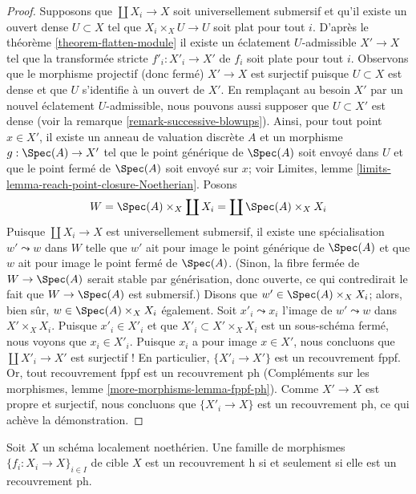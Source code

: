 \begin{proof}
\medskip\noindent
Supposons que $\coprod X_i \to X$ soit universellement submersif et
qu'il existe un ouvert dense $U \subset X$ tel que
$X_i \times_X U \to U$ soit plat pour tout $i$.
D'après le théorème \ref{theorem-flatten-module}
il existe un éclatement $U$-admissible $X' \to X$ tel que
la transformée stricte $f'_i : X'_i \to X'$ de $f_i$ soit plate pour tout $i$.
Observons que le morphisme projectif (donc fermé) $X' \to X$
est surjectif puisque $U \subset X$ est dense et que $U$ s'identifie
à un ouvert de $X'$. En remplaçant au besoin $X'$ par un nouvel
éclatement $U$-admissible, nous pouvons aussi supposer que $U \subset X'$ est dense
(voir la remarque \ref{remark-successive-blowups}).
Ainsi, pour tout point $x \in X'$, il existe un anneau de valuation discrète $A$
et un morphisme $g : \Spec(A) \to X'$ tel que le point
générique de $\Spec(A)$ soit envoyé dans $U$ et que le point fermé de
$\Spec(A)$ soit envoyé sur $x$; voir Limites, lemme
\ref{limits-lemma-reach-point-closure-Noetherian}.
Posons
$$
W = \Spec(A) \times_X \coprod X_i = \coprod \Spec(A) \times_X X_i
$$
Puisque $\coprod X_i \to X$ est universellement submersif,
il existe une spécialisation $w' \leadsto w$ dans $W$
telle que $w'$ ait pour image le point générique de $\Spec(A)$
et que $w$ ait pour image le point fermé de $\Spec(A)$.
(Sinon, la fibre fermée de $W \to \Spec(A)$
serait stable par générisation, donc ouverte, ce qui
contredirait le fait que $W \to \Spec(A)$ est submersif.)
Disons que $w' \in \Spec(A) \times_X X_i$; alors, bien sûr,
$w \in \Spec(A) \times_X X_i$ également. Soit
$x'_i \leadsto x_i$ l'image de $w' \leadsto w$ dans
$X' \times_X X_i$. Puisque $x'_i \in X'_i$ et que
$X'_i \subset X' \times_X X_i$ est un sous-schéma fermé,
nous voyons que $x_i \in X'_i$. Puisque $x_i$ a pour image $x \in X'$,
nous concluons que
$\coprod X'_i \to X'$ est surjectif ! En particulier,
$\{X'_i \to X'\}$ est un recouvrement fppf. Or, tout recouvrement fppf est un recouvrement ph
(Compléments sur les morphismes, lemme \ref{more-morphisms-lemma-fppf-ph}).
Comme $X' \to X$ est propre et surjectif, nous concluons
que $\{X'_i \to X\}$ est un recouvrement ph, ce qui achève la démonstration.
\end{proof}

\begin{lemma}
\label{lemma-Noetherian-h-ph}
Soit $X$ un schéma localement noethérien. Une famille de morphismes
$\{f_i : X_i \to X\}_{i \in I}$ de cible $X$ est un recouvrement h
si et seulement si elle est un recouvrement ph.
\end{lemma}

